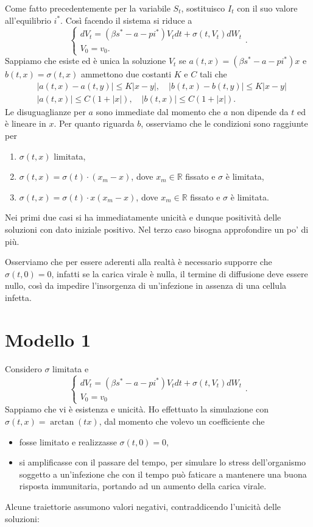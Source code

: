 \documentclass[12pt,a4paper,oneside]{amsart}
\newcommand{\R}{\mathbb{R}}
\renewcommand{\leq}{\leqslant}
\theoremstyle{definition}
\begin{document}
Come fatto precedentemente per la variabile $S_t$, sostituisco $I_t$ con il suo valore all'equilibrio $i^*$. Così facendo il sistema si riduce a $$\begin{cases}
dV_t=\left(\beta s^* -a -p i^*\right)V_tdt + \sigma(t,V_t)dW_t\\
V_0 = v_0.
\end{cases}.$$
Sappiamo che esiste ed è unica la soluzione $V_t$ se $a(t,x)=(\beta s^* -a -pi^*)x$ e $b(t,x)=\sigma(t,x)$ ammettono due costanti $K$ e $C$ tali che \begin{align*}
& |a(t,x)-a(t,y)|\leq K|x-y|, \quad |b(t,x)-b(t,y)|\leq K|x-y| \\
& |a(t,x)|\leq C(1+|x|), \quad |b(t,x)|\leq C(1+|x|).
\end{align*}
Le disuguaglianze per $a$ sono immediate dal momento che $a$ non dipende da $t$ ed è lineare in $x$. Per quanto riguarda $b$, osserviamo che le condizioni sono raggiunte per \begin{enumerate}
\item $\sigma(t,x)$ limitata,
\item $\sigma(t,x)=\sigma(t)\cdot (x_m-x)$, dove $x_m\in\R$ fissato e $\sigma$ è limitata,
\item $\sigma(t,x)=\sigma(t)\cdot x(x_m-x)$, dove $x_m\in\R$ fissato e $\sigma$ è limitata.
\end{enumerate}
Nei primi due casi si ha immediatamente unicità e dunque positività delle soluzioni con dato iniziale positivo. Nel terzo caso bisogna approfondire un po' di più.

Osserviamo che per essere aderenti alla realtà è necessario supporre che $\sigma(t,0)=0$, infatti se la carica virale è nulla, il termine di diffusione deve essere nullo, così da impedire l'insorgenza di un'infezione in assenza di una cellula infetta. 

\section{Modello 1}

Considero $\sigma$ limitata e $$\begin{cases}
dV_t=\left(\beta s^* -a -p i^*\right)V_tdt + \sigma(t,V_t)dW_t\\
V_0 = v_0
\end{cases}.$$
Sappiamo che vi è esistenza e unicità. Ho effettuato la simulazione con $\sigma(t,x)=\arctan(tx)$, dal momento che volevo un coefficiente che \begin{itemize}
\item fosse limitato e realizzasse $\sigma(t,0)=0$,
\item si amplificasse con il passare del tempo, per simulare lo stress dell'organismo soggetto a un'infezione che con il tempo può faticare a mantenere una buona risposta immunitaria, portando ad un aumento della carica virale.
\end{itemize}
Alcune traiettorie assumono valori negativi, contraddicendo l'unicità delle soluzioni:
\end{document}
